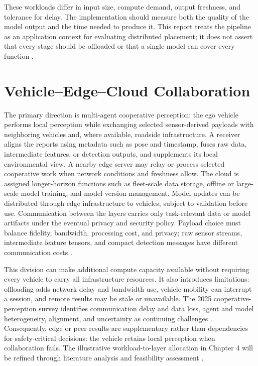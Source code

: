 \documentclass[12pt,a4paper,oneside]{report}
\begin{document}
These workloads differ in input size, compute demand, output freshness, and
tolerance for delay. The implementation should measure both the quality of
the model output and the time needed to produce it. This report treats the
pipeline as an application context for evaluating distributed placement;
it does not assert that every stage should be offloaded or that a single
model can cover every function \cite{biswas2023,hou2022,v2xvit2022,cobevt2023}.

\section{Vehicle--Edge--Cloud Collaboration}

The primary direction is multi-agent cooperative perception: the ego
vehicle performs local perception while exchanging selected sensor-derived
payloads with neighboring vehicles and, where available, roadside
infrastructure. A receiver aligns the reports using metadata such as pose
and timestamp, fuses raw data, intermediate features, or detection outputs,
and supplements its local environmental view. A nearby edge server may
relay or process selected cooperative work when network conditions and
freshness allow. The cloud is assigned
longer-horizon functions such as fleet-scale data storage, offline or
large-scale model training, and model version management. Model updates can
be distributed through edge infrastructure to vehicles, subject to
validation before use. Communication between the layers carries only
task-relevant data or model artifacts under the eventual privacy and
security policy. Payload choice must balance fidelity, bandwidth, processing
cost, and privacy; raw sensor streams, intermediate feature tensors, and
compact detection messages have different communication costs
\cite{opv2v2022,where2comm2022,v2xsurvey2025}.

This division can make additional compute capacity available without
requiring every vehicle to carry all infrastructure resources. It also
introduces limitations: offloading adds network delay and bandwidth use,
vehicle mobility can interrupt a session, and remote results may be stale
or unavailable. The 2025 cooperative-perception survey identifies
communication delay and data loss, agent and model heterogeneity, alignment,
and uncertainty as continuing challenges \cite{v2xsurvey2025}. Consequently,
edge or peer results are supplementary rather than dependencies for
safety-critical decisions: the vehicle retains local perception when
collaboration fails. The illustrative workload-to-layer allocation in
Chapter 4 will be refined through literature analysis and feasibility
assessment \cite{biswas2023,deng2020,v2xvit2022}.
\end{document}

